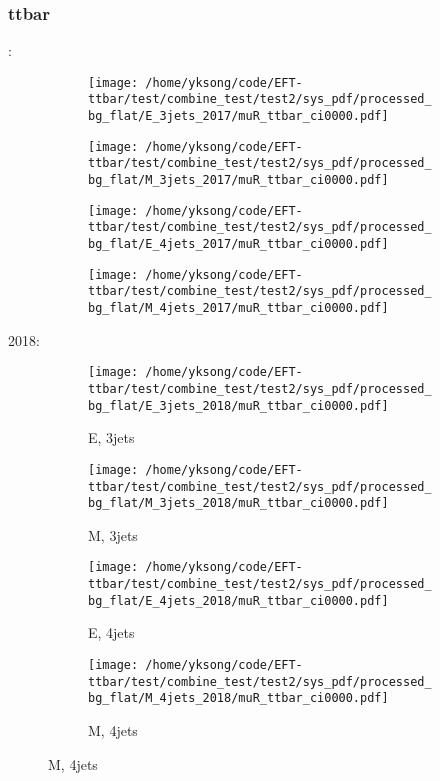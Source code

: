 \documentclass{beamer}
\begin{document}
\begin{frame}
\frametitle{ttbar}
\fontsize{5}{1}:
\begin{figure}
\centering
\begin{subfigure}[b]{0.24\textwidth}
\texttt{[image: /home/yksong/code/EFT-ttbar/test/combine\_test/test2/sys\_pdf/processed\_bg\_flat/E\_3jets\_2017/muR\_ttbar\_ci0000.pdf]}
\end{subfigure}
\begin{subfigure}[b]{0.24\textwidth}
\texttt{[image: /home/yksong/code/EFT-ttbar/test/combine\_test/test2/sys\_pdf/processed\_bg\_flat/M\_3jets\_2017/muR\_ttbar\_ci0000.pdf]}
\end{subfigure}
\begin{subfigure}[b]{0.24\textwidth}
\texttt{[image: /home/yksong/code/EFT-ttbar/test/combine\_test/test2/sys\_pdf/processed\_bg\_flat/E\_4jets\_2017/muR\_ttbar\_ci0000.pdf]}
\end{subfigure}
\begin{subfigure}[b]{0.24\textwidth}
\texttt{[image: /home/yksong/code/EFT-ttbar/test/combine\_test/test2/sys\_pdf/processed\_bg\_flat/M\_4jets\_2017/muR\_ttbar\_ci0000.pdf]}
\end{subfigure}
\end{figure}
2018:
\begin{figure}
\centering
\begin{subfigure}[b]{0.24\textwidth}
\texttt{[image: /home/yksong/code/EFT-ttbar/test/combine\_test/test2/sys\_pdf/processed\_bg\_flat/E\_3jets\_2018/muR\_ttbar\_ci0000.pdf]}
\captionsetup{font=tiny}
\caption{E, 3jets}
\end{subfigure}
\begin{subfigure}[b]{0.24\textwidth}
\texttt{[image: /home/yksong/code/EFT-ttbar/test/combine\_test/test2/sys\_pdf/processed\_bg\_flat/M\_3jets\_2018/muR\_ttbar\_ci0000.pdf]}
\captionsetup{font=tiny}
\caption{M, 3jets}
\end{subfigure}
\begin{subfigure}[b]{0.24\textwidth}
\texttt{[image: /home/yksong/code/EFT-ttbar/test/combine\_test/test2/sys\_pdf/processed\_bg\_flat/E\_4jets\_2018/muR\_ttbar\_ci0000.pdf]}
\captionsetup{font=tiny}
\caption{E, 4jets}
\end{subfigure}
\begin{subfigure}[b]{0.24\textwidth}
\texttt{[image: /home/yksong/code/EFT-ttbar/test/combine\_test/test2/sys\_pdf/processed\_bg\_flat/M\_4jets\_2018/muR\_ttbar\_ci0000.pdf]}
\captionsetup{font=tiny}
\caption{M, 4jets}
\end{subfigure}
\end{figure}
\end{frame}
\end{document}
